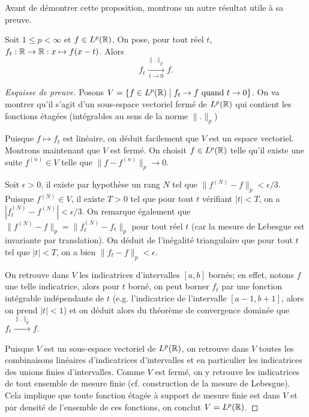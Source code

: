 Avant de démontrer cette proposition, montrons un autre résultat utile à
sa preuve.
\begin{thm}\label{conv:trans}
  Soit $1 \leq p < \infty$ et $f \in L^p(\mathbb{R})$. On pose, pour tout réel
  $t$, $f_t: \mathbb{R} \to \mathbb{R}: x\mapsto f(x - t)$.
  Alors
  $$f_t \xrightarrow[t\to 0]{\|.\|_p} f.$$
\end{thm}

\begin{proof}[Esquisse de preuve]
  Posons $V = \{f\in L^p(\mathbb{R}) \mid f_t \to f \mbox{ quand } t\to 0\}$.
  On va montrer qu'il s'agit d'un sous-espace vectoriel fermé de $L^p(\mathbb{R})$
  qui contient les fonctions étagées (intégrables au sens de la norme $\|.\|_p$)

  Puisque $f \mapsto f_t$ est linéaire, on déduit facilement que $V$ est
  un espace vectoriel. Montrons maintenant que $V$ est fermé. On choisit
  $f\in L^p(\mathbb{R})$ telle qu'il existe une suite $f^{(n)}\in V$ telle que
  $\|f - f^{(n)}\|_p\to 0$.

  Soit $\epsilon >0$, il existe par hypothèse un rang $N$ tel que
  $\|f^{(N)} - f\|_p < \epsilon/3$. Puisque $f^{(N)} \in V$, il existe
  $T > 0$ tel que pour tout $t$ vérifiant $|t| < T$, on a
  $|f^{(N)}_t - f^{(N)}| < \epsilon/3$. On remarque également
  que $\|f^{(N)} - f\|_p = \|f^{(N)}_t - f_t\|_p$ pour tout réel $t$ (car
  la mesure
  de Lebesgue est invariante par translation). On déduit de l'inégalité
  triangulaire que pour tout $t$ tel que $|t| < T$, on a bien
  $\|f_t - f \|_p < \epsilon$.

  On retrouve dans $V$ les indicatrices d'intervalles $[a, b]$ bornés;
  en effet, notons $f$ une telle indicatrice, alors pour $t$ borné,
  on peut borner $f_t$ par une fonction intégrable indépendante de $t$
  (e.g. l'indicatrice de l'intervalle  $[a - 1, b+1]$, alors on prend
  $|t| < 1$) et on déduit alors
  du théorème de convergence dominée que $f_t \xrightarrow{\|.\|_p} f$.

  Puisque $V$ est un sous-espace vectoriel de $L^p(\mathbb{R})$, on retrouve
  dans $V$ toutes les combinaisons linéaires d'indicatrices d'intervalles et
  en particulier les indicatrices des unions finies d'intervalles.
  Comme $V$ est fermé, on y retrouve les indicatrices de tout ensemble
  de mesure finie (cf. construction de la mesure de Lebesgue). Cela implique
  que toute fonction étagée à support de mesure finie
  est dans $V$ et par densité de l'ensemble de ces fonctions, on conclut
  $V = L^p(\mathbb{R})$.
\end{proof}

